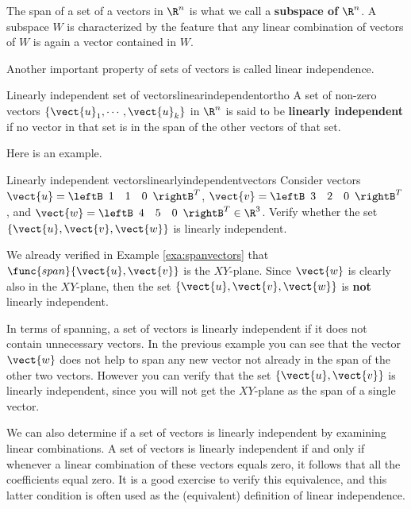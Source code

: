 The span of a set of a vectors in $\R^n$ is what we call a \textbf{subspace of $\R^n$}. A subspace $W$ is characterized by the feature that any linear combination of vectors of $W$ is again a vector contained in $W$. 

Another important property of sets of vectors is called linear independence. 

\begin{definition}{Linearly independent set of vectors}{linearindependentortho}
A set of non-zero vectors $\{ \vect{u}_1, \cdots ,\vect{u}_k\}$ in $\R^{n}$ is said to be 
\textbf{linearly independent}
 if no vector in that set is in the span of the other vectors of that set.
\end{definition}

Here is an example.  

\begin{example}{Linearly independent vectors}{linearlyindependentvectors}
Consider vectors $\vect{u}=\leftB 
\begin{array}{rrr}
1  & 1 & 0
\end{array}
\rightB^T$, 
$\vect{v}=\leftB 
\begin{array}{rrr}
3  & 2 & 0
\end{array}
\rightB^T$, and
$\vect{w}=\leftB 
\begin{array}{rrr}
4  & 5 & 0
\end{array}
\rightB^T  \in \R^{3}$.
Verify whether the set $\{\vect{u}, \vect{v}, \vect{w}\}$ is linearly independent. 
\end{example}

\begin{solution}
We already verified in Example \ref{exa:spanvectors} that
$\func{span} \{\vect{u}, \vect{v} \}$ is the $XY$-plane. Since $\vect{w}$
is clearly also in the $XY$-plane, then the set $\{\vect{u}, \vect{v},
\vect{w}\}$ is \textbf{not} linearly independent.
\end{solution}

In terms of spanning, a set of vectors is linearly independent if it
does not contain unnecessary vectors. In the previous example you
can see that the vector $\vect{w}$ does not help to span any new vector
not already in the span of the other two vectors. However you can
verify that the set $\{\vect{u}, \vect{v}\}$ is linearly independent,
since you will not get the $XY$-plane as the span of a single vector.

We can also determine if a set of vectors is linearly independent by examining linear combinations. A set of vectors is linearly independent if and only if
whenever a linear combination of these vectors equals zero, it follows
that all the coefficients equal zero. It is a good exercise to verify
this equivalence, and this latter condition is often used as the
(equivalent) definition of linear independence.

